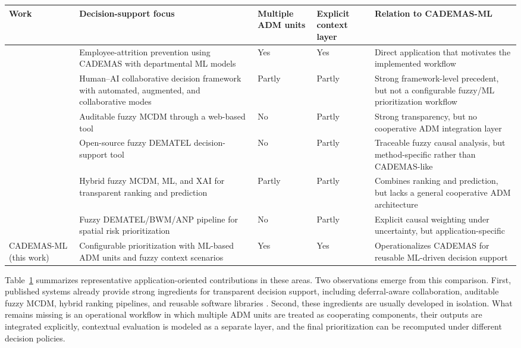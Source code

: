 \documentclass{interact}
\begin{document}
\begin{table}[!tb]
{\begin{tabularx}{\textwidth}{>{\raggedright\arraybackslash}p{2cm} >{\raggedright\arraybackslash}X p{2cm} p{2cm} >{\raggedright\arraybackslash}X}
		\toprule
		\textbf{Work} & \textbf{Decision-support focus} & \textbf{Multiple ADM units} & \textbf{Explicit context layer} & \textbf{Relation to CADEMAS-ML} \\
		\midrule
		\citet{Godz2026} & Employee-attrition prevention using CADEMAS with departmental ML models & Yes & Yes & Direct application that motivates the implemented workflow \\
		\citet{Tariq2024a} & Human--AI collaborative decision framework with automated, augmented, and collaborative modes & Partly & Partly & Strong framework-level precedent, but not a configurable fuzzy/ML prioritization workflow \\
		\citet{Wieckowski2024} & Auditable fuzzy MCDM through a web-based tool & No & Partly & Strong transparency, but no cooperative ADM integration layer \\
		\citet{Chekry2024} & Open-source fuzzy DEMATEL decision-support tool & No & Partly & Traceable fuzzy causal analysis, but method-specific rather than CADEMAS-like \\
		\citet{Ozkurt2025} & Hybrid fuzzy MCDM, ML, and XAI for transparent ranking and prediction & Partly & Partly & Combines ranking and prediction, but lacks a general cooperative ADM architecture \\
		\citet{Sahraei2022} & Fuzzy DEMATEL/BWM/ANP pipeline for spatial risk prioritization & No & Partly & Explicit causal weighting under uncertainty, but application-specific \\
		\midrule
		CADEMAS-ML (this work) & Configurable prioritization with ML-based ADM units and fuzzy context scenarios & Yes & Yes & Operationalizes CADEMAS for reusable ML-driven decision support \\
		\bottomrule
	\end{tabularx}}
\label{tab:related}
\end{table}

Table~\ref{tab:related} summarizes representative application-oriented contributions in these areas. Two observations emerge from this comparison. First, published systems already provide strong ingredients for transparent decision support, including deferral-aware collaboration, auditable fuzzy MCDM, hybrid ranking pipelines, and reusable software libraries \citep{Tariq2024a,Wieckowski2024,Ozkurt2025,Wieckowski2022}. Second, these ingredients are usually developed in isolation. What remains missing is an operational workflow in which multiple ADM units are treated as cooperating components, their outputs are integrated explicitly, contextual evaluation is modeled as a separate layer, and the final prioritization can be recomputed under different decision policies.
\end{document}
